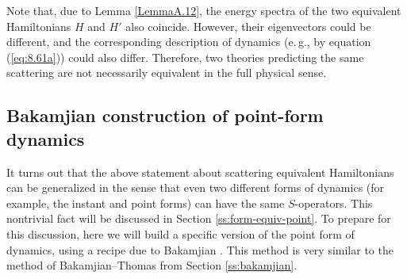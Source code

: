 \documentclass[]{stefan1}
\begin{document}
Note that, due to Lemma \ref{LemmaA.12}, the energy spectra of the two
equivalent Hamiltonians $ H $ and $ H '$ also coincide. However, their
eigenvectors could be different, and the corresponding description of
dynamics (e.\,g., by equation (\ref{eq:8.61a})) could also differ.
Therefore, two theories predicting the same scattering are not
necessarily equivalent in the full physical sense.

\subsection{Bakamjian construction of point-form dynamics}\label{bakam-point}
It turns out that the above statement about scattering equivalent
Hamiltonians can be generalized in the sense that even two different
forms of dynamics (for example, the instant and point forms) can have
the same $ S $-operators. This nontrivial fact will be discussed in
Section \ref{ss:form-equiv-point}. To prepare for this discussion, here
we will build a specific version of the point form of dynamics, using
a recipe due to Bakamjian \cite{Bakamjian}. This method is very
similar to the method of Bakamjian--Thomas from Section
\ref{ss:bakamjian}.
\end{document}
